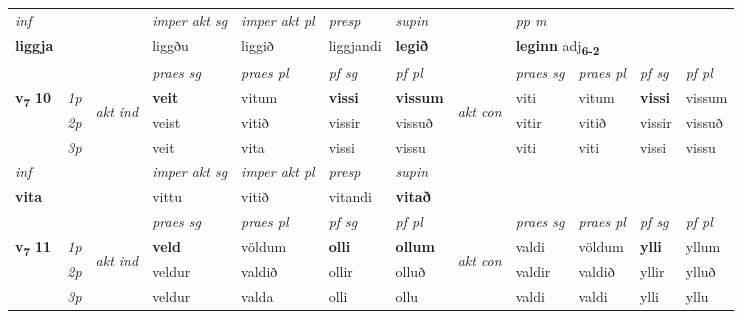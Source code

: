 \begin{longtable}[l]{X>{\footnotesize\itshape}llXXXXlXXXX}
\cmidrule{4-7}
   {\textit{inf}} & &  & \textit{imper akt sg} & \textit{imper akt pl}   & \textit{presp} & \textit{supin}  && \textit{pp m} \\*
  {\textbf{liggja}} & && liggðu  & liggið   & liggjandi &  \textbf{legið}  && \multicolumn{2}{l}{\textbf{leginn} adj\textbf{\textsubscript{6-2}}} \\*

\midrule

 & &   & \textit{praes sg}  & \textit{praes pl}    & \textit{ pf sg} & \textit{pf pl} & & \textit{praes sg}  & \textit{praes pl}    & \textit{pf sg} & \textit{pf pl }  \\ \cmidrule{4-7} \cmidrule{9-12}
 \multirow{2}{*}{{{\textbf{v{\textsubscript{7}}} \Large{\textbf{10}}}}}  & 1p & \multirow{3}{*}{\begin{turn}{90}\textit{akt ind}\end{turn}} & \textbf{veit} & vitum & \textbf{vissi} & \textbf{vissum} & \multirow{3}{*}{\begin{turn}{90}\textit{akt con}\end{turn}} &viti & vitum & \textbf{vissi} & vissum\\*
 & 2p &  &  veist  & vitið & vissir & vissuð & & vitir & vitið & vissir & vissuð \\*
 & 3p &  & veit & vita & vissi & vissu & & viti & viti& vissi & vissu \\*
\cmidrule{4-7} \cmidrule{9-12}

   {\textit{inf}} & &  & \textit{imper akt sg} & \textit{imper akt pl}   & \textit{presp} & \textit{supin}   \\*
  {\textbf{vita}} & && vittu  & vitið   & vitandi &  \textbf{vitað}   \\*

\midrule

 & &   & \textit{praes sg}  & \textit{praes pl}    & \textit{ pf sg} & \textit{pf pl} & & \textit{praes sg}  & \textit{praes pl}    & \textit{pf sg} & \textit{pf pl }  \\ \cmidrule{4-7} \cmidrule{9-12}
 \multirow{2}{*}{{{\textbf{v{\textsubscript{7}}} \Large{\textbf{11}}}}}  & 1p & \multirow{3}{*}{\begin{turn}{90}\textit{akt ind}\end{turn}} & \textbf{veld} & völdum & \textbf{olli} & \textbf{ollum} & \multirow{3}{*}{\begin{turn}{90}\textit{akt con}\end{turn}} &valdi & völdum & \textbf{ylli} & yllum\\*
 & 2p &  &  veldur  & valdið & ollir & olluð & & valdir & valdið & yllir & ylluð \\*
 & 3p &  & veldur & valda & olli & ollu & & valdi & valdi& ylli & yllu \\*
\cmidrule{4-7} \cmidrule{9-12}


\end{longtable}
